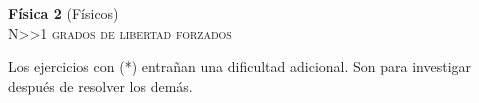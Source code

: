 \documentclass[11pt,spanish,a4paper]{article}
\begin{document}
\begin{center}
	\textbf{Física 2} (Físicos) \hfill {}\\
	\textsc{\LARGE N\textgreater\textgreater1 grados de libertad forzados}
\end{center}

Los ejercicios con (*) entrañan una dificultad adicional. Son para investigar después de resolver los demás.


\begin{enumerate}

}

\end{enumerate}
\end{document}
